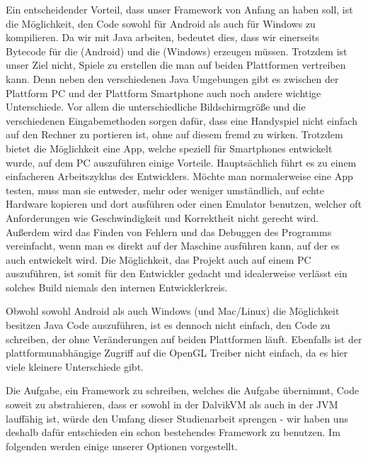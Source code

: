 Ein entscheidender Vorteil, dass unser Framework von Anfang an haben soll, ist die Möglichkeit, den Code sowohl für Android als auch für Windows zu kompilieren.
Da wir mit Java arbeiten, bedeutet dies, dass wir einerseits Bytecode für die  (Android) und die  (Windows) erzeugen müssen.
Trotzdem ist unser Ziel nicht, Spiele zu erstellen die man auf beiden Plattformen vertreiben kann.
Denn neben den verschiedenen Java Umgebungen gibt es zwischen der Plattform PC und der Plattform Smartphone auch noch andere wichtige Unterschiede.
Vor allem die unterschiedliche Bildschirmgröße und die verschiedenen Eingabemethoden sorgen dafür, dass eine Handyspiel nicht einfach auf den Rechner zu portieren ist, ohne auf diesem fremd zu wirken.
Trotzdem bietet die Möglichkeit eine App, welche speziell für Smartphones entwickelt wurde, auf dem PC auszuführen einige Vorteile.
Hauptsächlich führt es zu einem einfacheren Arbeitszyklus des Entwicklers. Möchte man normalerweise eine App testen, muss man sie entweder, mehr oder weniger umständlich, auf echte Hardware kopieren und dort ausführen oder einen Emulator benutzen, welcher oft Anforderungen wie Geschwindigkeit und Korrektheit nicht gerecht wird. Außerdem wird das Finden von Fehlern und das Debuggen des Programms vereinfacht, wenn man es direkt auf der Maschine ausführen kann, auf der es auch entwickelt wird.
Die Möglichkeit, das Projekt auch auf einem PC auszuführen, ist somit für den Entwickler gedacht und idealerweise verlässt ein solches Build niemals den internen Entwicklerkreis.


Obwohl sowohl Android als auch Windows (und Mac/Linux) die Möglichkeit besitzen Java Code auszuführen, ist es dennoch nicht einfach, den Code zu schreiben, der ohne Veränderungen auf beiden Plattformen läuft. Ebenfalls ist der plattformunabhängige Zugriff auf die OpenGL Treiber nicht einfach, da es hier viele kleinere Unterschiede gibt.

Die Aufgabe, ein Framework zu schreiben, welches die Aufgabe übernimmt, Code soweit zu abstrahieren, dass er sowohl in der DalvikVM als auch in der JVM lauffähig ist, würde den Umfang dieser Studienarbeit sprengen - wir haben uns deshalb dafür entschieden ein schon bestehendes Framework zu benutzen. Im folgenden werden einige unserer Optionen vorgestellt.
